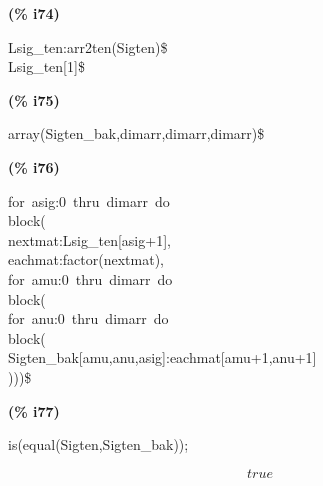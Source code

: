 \documentclass[fleqn]{article}
\begin{document}
\noindent%



\noindent
\begin{minipage}[t]{4.000000em}\color{red}\bfseries
(\% i74)	
\end{minipage}
\begin{minipage}[t]{\textwidth}\color{blue}
Lsig\_ten:arr2ten(Sigten)\$\\
Lsig\_ten[1]\$
\end{minipage}

\noindent%



\noindent
\begin{minipage}[t]{4.000000em}\color{red}\bfseries
(\% i75)	
\end{minipage}
\begin{minipage}[t]{\textwidth}\color{blue}
array(Sigten\_bak,dimarr,dimarr,dimarr)\$
\end{minipage}

\noindent%



\noindent
\begin{minipage}[t]{4.000000em}\color{red}\bfseries
(\% i76)	
\end{minipage}
\begin{minipage}[t]{\textwidth}\color{blue}
for\ asig:0\ thru\ dimarr\ do\\
block(\\
nextmat:Lsig\_ten[asig+1],\\
eachmat:factor(nextmat),\\
for\ amu:0\ thru\ dimarr\ do\\
block(\\
for\ anu:0\ thru\ dimarr\ do\\
block(\\
Sigten\_bak[amu,anu,asig]:eachmat[amu+1,anu+1]\\
)))\$
\end{minipage}

\noindent%



\noindent
\begin{minipage}[t]{4.000000em}\color{red}\bfseries
(\% i77)	
\end{minipage}
\begin{minipage}[t]{\textwidth}\color{blue}
is(equal(Sigten,Sigten\_bak));
\end{minipage}
\[\displaystyle \tag{\% o77} 
true\mbox{}
\]
\end{document}
